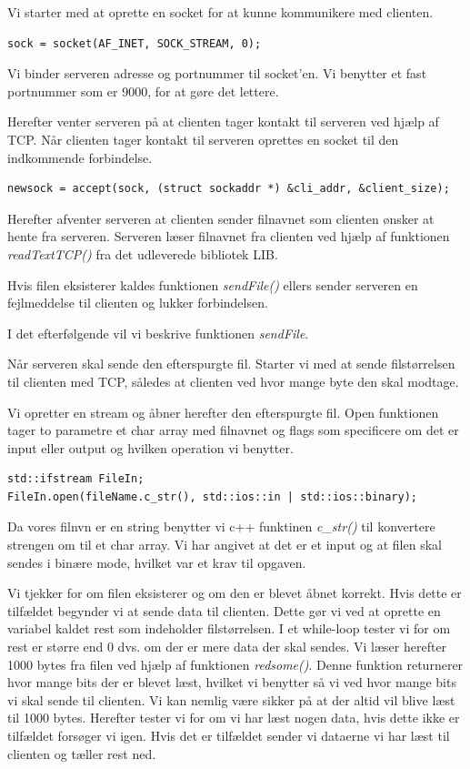 Vi starter med at oprette en socket for at kunne kommunikere med clienten. \\

\begin{lstlisting}
sock = socket(AF_INET, SOCK_STREAM, 0);
\end{lstlisting}

Vi binder serveren adresse og portnummer til socket'en. Vi benytter et fast portnummer som er 9000, for at gøre det lettere. 

Herefter venter serveren på at clienten tager kontakt til serveren ved hjælp af TCP. Når clienten tager kontakt til serveren oprettes en socket til den indkommende forbindelse. 

\begin{lstlisting}
newsock = accept(sock, (struct sockaddr *) &cli_addr, &client_size);
\end{lstlisting}

Herefter afventer serveren at clienten sender filnavnet som clienten ønsker at hente fra serveren. Serveren læser filnavnet fra clienten ved hjælp af funktionen \textit{readTextTCP()} fra det udleverede bibliotek LIB. 

Hvis filen eksisterer kaldes funktionen \textit{sendFile()} ellers sender serveren en fejlmeddelse til clienten og lukker forbindelsen. 

I det efterfølgende vil vi beskrive funktionen \textit{sendFile}. 

Når serveren skal sende den efterspurgte fil. Starter vi med at sende filstørrelsen til clienten med TCP, således at clienten ved hvor mange byte den skal modtage. 

Vi opretter en stream og åbner herefter den efterspurgte fil. Open funktionen tager to parametre et char array med filnavnet og flags som specificere om det er input eller output og hvilken operation vi benytter. 

\begin{lstlisting}
std::ifstream FileIn; 
FileIn.open(fileName.c_str(), std::ios::in | std::ios::binary);
\end{lstlisting}

Da vores filnvn er en string benytter vi c++ funktinen \textit{c\_str()} til konvertere strengen om til et char array. Vi har angivet at det er et input og at filen skal sendes i binære mode, hvilket var et krav til opgaven. 

Vi tjekker for om filen eksisterer og om den er blevet åbnet korrekt.
Hvis dette er tilfældet begynder vi at sende data til clienten. Dette gør vi ved at oprette en variabel kaldet rest som indeholder filstørrelsen. 
I et while-loop tester vi for om rest er større end 0 dvs. om der er mere data der skal sendes. 
Vi læser herefter 1000 bytes fra filen ved hjælp af funktionen \textit{redsome()}. Denne funktion returnerer hvor mange bits der er blevet læst, hvilket vi benytter så vi ved hvor mange bits vi skal sende til clienten. Vi kan nemlig være sikker på at der altid vil blive læst til 1000 bytes. 
Herefter tester vi for om vi har læst nogen data, hvis dette ikke er tilfældet forsøger vi igen. Hvis det er tilfældet sender vi dataerne vi har læst til clienten og tæller rest ned. 

